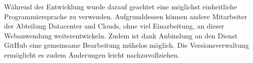 Während der Entwicklung wurde darauf geachtet eine möglichst einheitliche Programmiersprache zu verwenden.
Aufgrunddessen können andere Mitarbeiter der Abteilung Datacenter and Clouds, ohne viel Einarbeitung, an dieser Webanwendung weiterentwickeln.
Zudem ist dank Anbindung an den Dienst GitHub eine gemeinsame Bearbeitung mühelos möglich.
Die Versionsverwaltung ermöglicht es zudem Änderungen leicht nachzuvollziehen.







